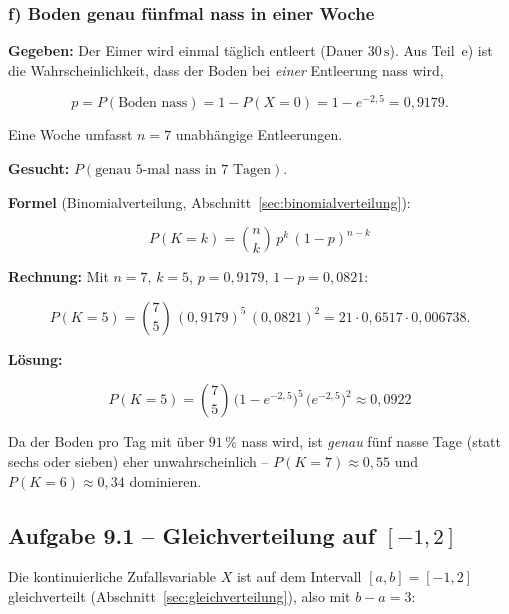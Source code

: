 \subsubsection*{f) Boden genau fünfmal nass in einer Woche}

\begin{beispiel}

\textbf{Gegeben:} Der Eimer wird einmal täglich entleert (Dauer $30\,\mathrm{s}$).
Aus Teil~e) ist die Wahrscheinlichkeit, dass der Boden bei \emph{einer}
Entleerung nass wird,

$$
p = P(\text{Boden nass}) = 1 - P(X = 0) = 1 - e^{-2{,}5} = 0{,}9179.
$$

Eine Woche umfasst $n = 7$ unabhängige Entleerungen.

\textbf{Gesucht:} $P(\text{genau } 5\text{-mal nass in } 7 \text{ Tagen})$.

\textbf{Formel} (Binomialverteilung, Abschnitt~\ref{sec:binomialverteilung}):

$$
P(K = k) = \binom{n}{k}\, p^k\, (1 - p)^{n - k}
$$

\textbf{Rechnung:} Mit $n = 7$, $k = 5$, $p = 0{,}9179$, $1 - p = 0{,}0821$:

$$
P(K = 5) = \binom{7}{5}\, (0{,}9179)^5\, (0{,}0821)^2
= 21 \cdot 0{,}6517 \cdot 0{,}006738.
$$

\textbf{Lösung:}

$$
\boxed{\;P(K = 5) = \binom{7}{5}\,\bigl(1 - e^{-2{,}5}\bigr)^5\,\bigl(e^{-2{,}5}\bigr)^2
\approx 0{,}0922\;}
$$

Da der Boden pro Tag mit über $91\,\%$ nass wird, ist \emph{genau} fünf nasse
Tage (statt sechs oder sieben) eher unwahrscheinlich -- $P(K=7) \approx 0{,}55$
und $P(K=6) \approx 0{,}34$ dominieren.

\end{beispiel}

\subsection*{Aufgabe 9.1 – Gleichverteilung auf $[-1, 2]$}

Die kontinuierliche Zufallsvariable $X$ ist auf dem Intervall $[a, b] = [-1, 2]$
gleichverteilt (Abschnitt~\ref{sec:gleichverteilung}), also mit
$b - a = 3$:

